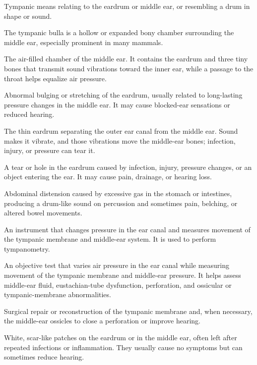  Tympanic means relating to the eardrum or middle ear, or resembling a drum in shape or sound.

 The tympanic bulla is a hollow or expanded bony chamber surrounding the middle ear, especially prominent in many mammals.

 The air-filled chamber of the middle ear. It contains the eardrum and three tiny bones that transmit sound vibrations toward the inner ear, while a passage to the throat helps equalize air pressure.

 Abnormal bulging or stretching of the eardrum, usually related to long-lasting pressure changes in the middle ear. It may cause blocked-ear sensations or reduced hearing.

 The thin eardrum separating the outer ear canal from the middle ear. Sound makes it vibrate, and those vibrations move the middle-ear bones; infection, injury, or pressure can tear it.

 A tear or hole in the eardrum caused by infection, injury, pressure changes, or an object entering the ear. It may cause pain, drainage, or hearing loss.

 Abdominal distension caused by excessive gas in the stomach or intestines, producing a drum-like sound on percussion and sometimes pain, belching, or altered bowel movements.

 An instrument that changes pressure in the ear canal and measures movement of the tympanic membrane and middle-ear system. It is used to perform tympanometry.

 An objective test that varies air pressure in the ear canal while measuring movement of the tympanic membrane and middle-ear pressure. It helps assess middle-ear fluid, eustachian-tube dysfunction, perforation, and ossicular or tympanic-membrane abnormalities.

 Surgical repair or reconstruction of the tympanic membrane and, when necessary, the middle-ear ossicles to close a perforation or improve hearing.

 White, scar-like patches on the eardrum or in the middle ear, often left after repeated infections or inflammation. They usually cause no symptoms but can sometimes reduce hearing.

